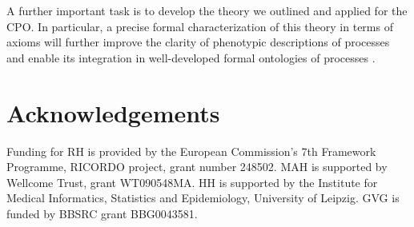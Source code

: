 \documentclass{bioinfo}
\renewcommand{\cite}{\citep}
\begin{document}
A further important task is to develop the theory we outlined and
applied for the CPO. In particular, a precise formal characterization
of this theory in terms of axioms will further improve the clarity of
phenotypic descriptions of processes and enable its integration in
well-developed formal ontologies of processes \cite{Herre2006,
  Gruninger2010}.

\section{Acknowledgements}
Funding for RH is provided by the European Commission's 7th
Framework Programme, RICORDO project, grant number 248502. MAH is
supported by Wellcome Trust, grant WT090548MA. HH is supported by the
Institute for Medical Informatics, Statistics and Epidemiology,
University of Leipzig. GVG is funded by BBSRC grant BBG0043581. 


    




 



\end{document}
